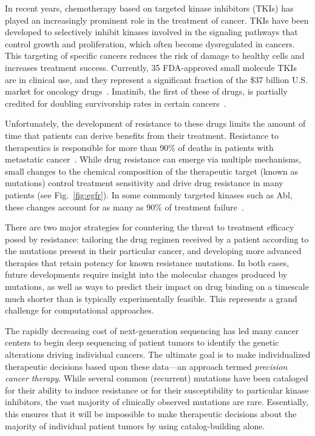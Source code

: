 In recent years, chemotherapy based on targeted kinase inhibitors (TKIs) has
played an increasingly prominent role in the treatment of cancer. TKIs have
been developed to selectively inhibit kinases involved in the signaling
pathways that control growth and proliferation, which often become
dysregulated in cancers. This targeting of specific cancers reduces the risk
of damage to healthy cells and increases treatment success. Currently, 35
FDA-approved small molecule TKIs are in clinical use, and they represent a
significant fraction of the \$37 billion U.S. market for oncology
drugs~\cite{FDA, Zhao2014}. Imatinib, the first of these of drugs, is
partially credited for doubling survivorship rates in certain
cancers~\cite{Zhao2014, ACSreport}.

Unfortunately, the development of resistance to these drugs limits the amount
of time that patients can derive benefits from their treatment. Resistance to
therapeutics is responsible for more than 90\% of deaths in patients with
metastatic cancer~\cite{Longley2005}. While drug resistance can emerge via
multiple mechanisms, small changes to the chemical composition of the
therapeutic target (known as mutations) control treatment sensitivity and
drive drug resistance in many patients (see Fig.~\ref{fig:egfr}). In some
commonly targeted kinases such as Abl, these changes account for as many as
90\% of treatment failure~\cite{Shah2002}.

There are two major strategies for countering the threat to treatment
efficacy posed by resistance: tailoring the drug regimen received by a
patient according to the mutations present in their particular cancer, and
developing more advanced therapies that retain potency for known resistance
mutations. In both cases, future developments require insight into the
molecular changes produced by mutations, as well as ways to predict their
impact on drug binding on a timescale much shorter than is typically
experimentally feasible. This represents a grand challenge for computational
approaches.

The rapidly decreasing cost of next-generation sequencing has led many cancer
centers to begin deep sequencing of patient tumors to identify the genetic
alterations driving individual cancers. The ultimate goal is to make
individualized therapeutic decisions based upon these data---an approach
termed \textit{precision cancer therapy}. While several common (recurrent)
mutations have been cataloged for their ability to induce resistance or for
their susceptibility to particular kinase inhibitors, the vast majority of
clinically observed mutations are rare. Essentially, this ensures that it
will be impossible to make therapeutic decisions about the majority of
individual patient tumors by using catalog-building alone.

